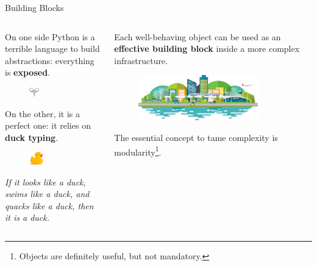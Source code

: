 \documentclass[9pt]{beamer}
\begin{document}
\begin{frame}{Building Blocks}
    \begin{columns}
        \begin{column}{0.5\textwidth}
            On one side Python is a terrible language to build abstractions:
            everything is \textbf{exposed}.
            \begin{figure}
                \centering
                \includegraphics[width=0.2\textwidth]{capsule}
            \end{figure}

            On the other, it is a perfect one: it relies on \textbf{duck typing}.
            \begin{figure}
                \centering
                \includegraphics[width=0.3\textwidth]{duck.png}
            \end{figure}

            \begin{center}
                \itshape
                If it looks like a duck, swims like a duck, and quacks like a
                duck, then it is a duck.
            \end{center}
        \end{column}
        \begin{column}{0.5\textwidth}
            Each well-behaving object can be used as an \textbf{effective
            building block} inside a more complex infrastructure.
            \vspace*{20pt}

            \begin{figure}
                \centering
                \includegraphics[width=0.8\textwidth]{infrastructure}
            \end{figure}
            \vspace*{20pt}

            The essential concept to tame complexity is modularity\footnote{
                Objects are definitely useful, but not mandatory.
            }.
        \end{column}
    \end{columns}
\end{frame}
\end{document}
